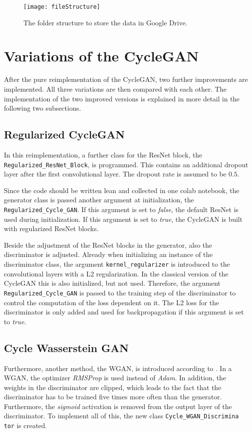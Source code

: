 \documentclass[fleqn,10pt]{SelfArx} %
\begin{document}
\begin{figure}[htb] 
	\centering 
	\texttt{[image: fileStructure]}
	\caption{The folder structure to store the data in Google Drive.}
	\label{fig:fileStructure}
\end{figure}

\section{Variations of the Cycle\ac{GAN}}
After the pure reimplementation of the Cycle\ac{GAN}, two further improvements are implemented. All three variations are then compared with each other. The implementation of the two improved versions is explained in more detail in the following two subsections.

\subsection{Regularized CycleGAN}
In this reimplementation, a further class for the \ac{ResNet} block, the \texttt{Regularized\_ResNet\_Block}, is programmed. This contains an additional dropout layer after the first convolutional layer. The dropout rate is assumed to be $0.5$.

Since the code should be written lean and collected in one colab notebook, the generator class is passed another argument at initialization, the \texttt{Regularized\_Cycle\_GAN}. If this argument is set to \textit{false}, the default \ac{ResNet} is used during initialization. If this argument is set to \textit{true}, the Cycle\ac{GAN} is built with regularized \ac{ResNet} blocks.

Beside the adjustment of the \ac{ResNet} blocks in the generator, also the discriminator is adjusted. Already when initializing an instance of the discriminator class, the argument \texttt{kernel\_regularizer} is introduced to the convolutional layers with a L2 regularization. In the classical version of the Cycle\ac{GAN} this is also initialized, but not used. Therefore, the argument \texttt{Regularized\_Cycle\_GAN} is passed to the training step of the discriminator to control the computation of the loss dependent on it. The L2 loss for the discriminator is only added and used for backpropagation if this argument is set to \textit{true}.

\subsection{Cycle Wasserstein \ac{GAN}}
Furthermore, another method, the \ac{WGAN}, is introduced according to \cite{wgan-improvement}. In a \ac{WGAN}, the optimizer \textit{\ac{RMSProp}} is used instead of \textit{Adam}. In addition, the weights in the discriminator are clipped, which leads to the fact that the discriminator has to be trained five times more often than the generator. Furthermore, the \textit{sigmoid} activation is removed from the output layer of the discriminator. To implement all of this, the new class \texttt{Cycle\_WGAN\_Discrimina tor} is created.
\end{document}
